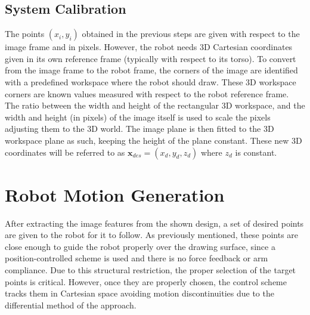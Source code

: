 \documentclass[conference]{IEEEtran}
\newcommand{\x}{\mathbf x}
\begin{document}

\subsection{System Calibration}

The points $(x_i,y_i)$ obtained in the previous steps are given with respect to the image frame and in pixels. However, the robot needs 3D Cartesian coordinates given in its own reference frame \cite{singh2015sketch} (typically with respect to its torso). To convert from the image frame to the robot frame, the corners of the image are identified with a predefined workspace where the robot should draw. These 3D workspace corners are known values measured with respect to the robot reference frame. The ratio between the width and height of the rectangular 3D workspace, and the width and height (in pixels) of the image itself is used to scale the pixels adjusting them to the 3D world. The image plane is then fitted to the 3D workspace plane as such, keeping the height of the plane constant. These new 3D coordinates will be referred to as $\x_{des} = (x_d, y_d, z_d)$ where $z_d$ is constant.

\section{Robot Motion Generation}

After extracting the image features from the shown design, a set of desired points are given to the robot for it to follow. As previously mentioned, these points are close enough to guide the robot properly over the drawing surface, since a position-controlled scheme is used and there is no force feedback or arm compliance. Due to this structural restriction, the proper selection of the target points is critical. However, once they are properly chosen, the control scheme tracks them in Cartesian space avoiding motion discontinuities due to the differential method of the approach.
\end{document}
